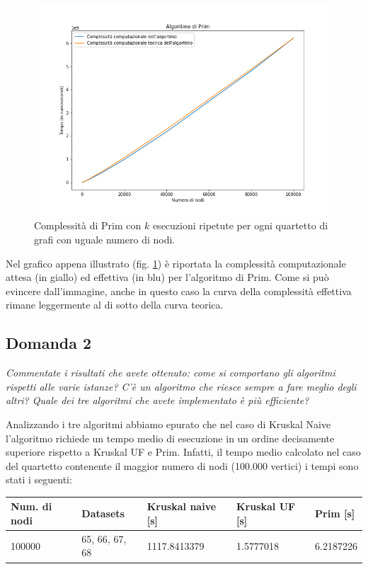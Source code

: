 \begin{figure}[H]
	\centering
	\includegraphics[width=1\textwidth]{res/images/graph-complexity/prim.png}
		\caption{Complessità di Prim con \(k\) esecuzioni ripetute per ogni quartetto di grafi con uguale numero di nodi.}
	\label{fig:prim}
\end{figure}


Nel grafico appena illustrato (fig. \ref{fig:prim}) è riportata la complessità computazionale attesa (in giallo) ed effettiva (in blu) per l'algoritmo di Prim.
Come si può evincere dall'immagine, anche in questo caso la curva della complessità effettiva rimane leggermente al di sotto della curva teorica.




\subsection{Domanda 2}
\textit{Commentate i risultati che avete ottenuto: come si comportano gli
algoritmi rispetti alle varie istanze? C'è un algoritmo che riesce sempre a fare meglio
degli altri? Quale dei tre algoritmi che avete implementato è più efficiente?}


Analizzando i tre algoritmi abbiamo epurato che nel caso di Kruskal Naive l'algoritmo richiede un tempo medio di esecuzione in un ordine decisamente superiore rispetto a Kruskal UF e Prim. Infatti, il tempo medio calcolato nel caso del quartetto contenente il maggior numero di nodi (100.000 vertici) i tempi sono stati i seguenti:

\begin{table}[H]\centering
	\begin{tabular}{l|l|l|l|l}
        \textbf{Num. di nodi} & \textbf{Datasets} & \textbf{Kruskal naive [s]} & \textbf{Kruskal UF [s]} & \textbf{Prim [s]} \\
    \hline
	100000 & 65, 66, 67, 68 & 1117.8413379  & 1.5777018  & 6.2187226 
	\end{tabular}
\end{table}


